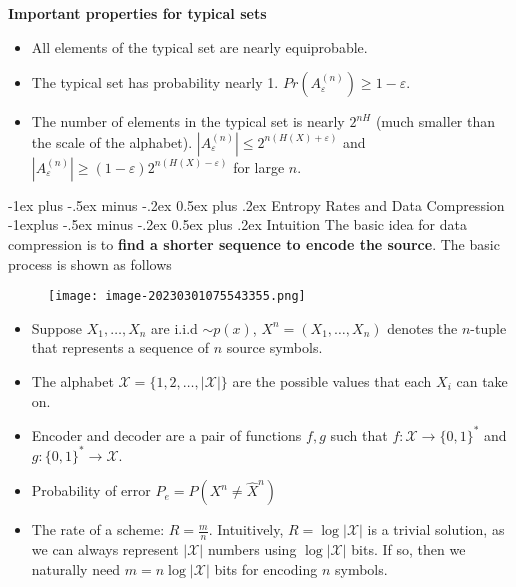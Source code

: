 \documentclass[10pt,landscape, a4paper]{article}
\makeatletter
\renewcommand{\section}{\@startsection{section}{1}{0mm}%
                                {-1ex plus -.5ex minus -.2ex}%
                                {0.5ex plus .2ex}%
                                {\normalfont\large\bfseries}}
\renewcommand{\subsection}{\@startsection{subsection}{2}{0mm}%
                                {-1explus -.5ex minus -.2ex}%
                                {0.5ex plus .2ex}%
                                {\normalfont\normalsize\bfseries}}
\makeatother
\begin{document}
\begin{multicols}{3}
\textbf{Important properties for typical sets}
\begin{itemize}
    \item All elements of the typical set are nearly equiprobable. 
    \item The typical set has probability nearly 1. $Pr(A_\varepsilon^{(n)})\ge 1-\varepsilon$.
    \item The number of elements in the typical set is nearly $2^{nH}$ (much smaller than the scale of the alphabet). $|A_\varepsilon^{(n)}|\le 2^{n(H(X)+\varepsilon)}$ and $|A_\varepsilon^{(n)}|\ge (1-\varepsilon)2^{n(H(X)-\varepsilon)}$ for large $n$.
\end{itemize}

\section{Entropy Rates and Data Compression}
\subsection{Intuition}
The basic idea for data compression is to \textbf{find a shorter sequence to encode the source}. The basic process is shown as follows
\begin{figure}[H]
    \centering
    \texttt{[image: image-20230301075543355.png]}
\end{figure}

\begin{itemize}
    \item Suppose $X_1, \dots, X_n$ are i.i.d $\sim p(x)$, $X^n=(X_1,\dots, X_n)$ denotes the $n$-tuple that represents a sequence of $n$ source symbols. 
    \item The alphabet $\mathcal{X}=\{1,2,\dots, |\mathcal{X}|\}$ are the possible values that each $X_i$ can take on.
    \item Encoder and decoder are a pair of functions $f,g$ such that $f:\mathcal{X}\rightarrow \{0,1\}^*$ and $g:\{0,1\}^*\rightarrow \mathcal{X}$.
    \item Probability of error $P_e=P(X^n\ne \hat{X}^n)$
    \item The rate of a scheme: $R=\frac{m}{n}$. Intuitively, $R=\log|\mathcal{X}|$ is a trivial solution, as we can always represent $|\mathcal{X}|$ numbers using $\log|\mathcal{X}|$ bits. If so, then we naturally need $m=n\log|\mathcal{X}|$ bits for encoding $n$ symbols.
\end{itemize}


\end{multicols}
\end{document}
